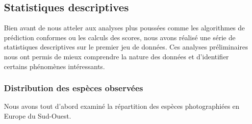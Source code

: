 \documentclass[a4paper,12pt]{article}
\begin{document}

\subsection{Statistiques descriptives}

Bien avant de nous atteler aux analyses plus poussées comme les algorithmes de prédiction conformes ou les calculs des scores, nous avons réalisé une série de statistiques descriptives sur le premier jeu de données. Ces analyses préliminaires nous ont permis de mieux comprendre la nature des données et d'identifier certains phénomènes intéressants.

\subsubsection{Distribution des espèces observées}

Nous avons tout d'abord examiné la répartition des espèces photographiées en Europe du Sud-Ouest.
\end{document}
